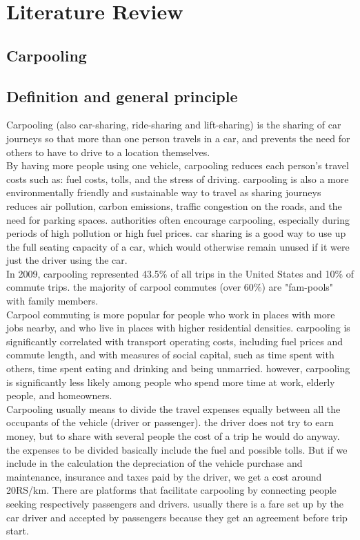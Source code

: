 \chapter{Literature Review} \label{chap:literatureReview}

\section*{Carpooling}

\section{Definition and general principle}
\justify
Carpooling (also car-sharing, ride-sharing and lift-sharing) is the sharing of car journeys so that more than one person travels in a car, and prevents the need for others to have to drive to a location themselves.
\\ By having more people using one vehicle, carpooling reduces each person's travel costs 
such as: fuel costs, tolls, and the stress of driving. carpooling is also a more environmentally 
friendly and sustainable way to travel as sharing journeys reduces air pollution, carbon emissions, traffic congestion on the roads, and the need for parking spaces. authorities often encourage carpooling, especially during periods of high pollution or high fuel prices. car sharing is a good way to use up the full seating capacity of a car, which would otherwise remain unused if it were just the driver using the car.
\\ In 2009, carpooling represented 43.5\% of all trips in the United States and 10\% of commute trips. the majority of carpool commutes (over 60\%) are "fam-pools" with family members.
\\ Carpool commuting is more popular for people who work in places with more jobs 
nearby, and who live in places with higher residential densities. carpooling is significantly correlated with transport operating costs, including fuel prices and commute length, and with measures of social capital, such as time spent with others, time spent eating and drinking and being unmarried. however, carpooling is significantly less likely among people who spend more time at work, elderly people, and homeowners.
\\ Carpooling usually means to divide the travel expenses equally between all the 
occupants of the vehicle (driver or passenger). the driver does not try to earn money, but 
to share with several people the cost of a trip he would do anyway. the expenses to be divided basically include the fuel and possible tolls. But if we include in the calculation the depreciation of the vehicle purchase and maintenance, insurance and taxes paid by the driver, we get a cost around 20RS/km. There are platforms that facilitate carpooling by connecting people seeking respectively passengers and drivers. usually there is a fare set up by the car driver and accepted by passengers because they get an agreement before trip start.

